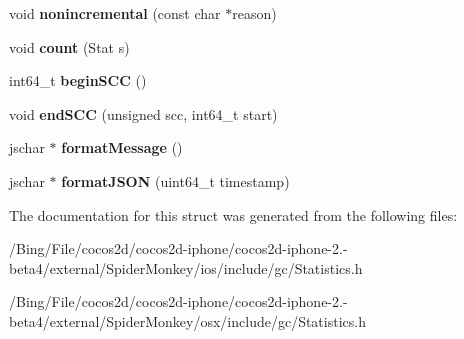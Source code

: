 \begin{DoxyCompactItemize}
\item 
\hypertarget{structjs_1_1gcstats_1_1_statistics_ab71d750226cbb59fd2d0da02285a755c}{void {\bfseries nonincremental} (const char $\ast$reason)}\label{structjs_1_1gcstats_1_1_statistics_ab71d750226cbb59fd2d0da02285a755c}

\item 
\hypertarget{structjs_1_1gcstats_1_1_statistics_aea50e1fa21da3e2770e721401b13457b}{void {\bfseries count} (Stat s)}\label{structjs_1_1gcstats_1_1_statistics_aea50e1fa21da3e2770e721401b13457b}

\item 
\hypertarget{structjs_1_1gcstats_1_1_statistics_a812221f80b7d1d6190cb93b535b62001}{int64\-\_\-t {\bfseries begin\-S\-C\-C} ()}\label{structjs_1_1gcstats_1_1_statistics_a812221f80b7d1d6190cb93b535b62001}

\item 
\hypertarget{structjs_1_1gcstats_1_1_statistics_ac4263ad5f5a8de70f1fbaf395f9a79da}{void {\bfseries end\-S\-C\-C} (unsigned scc, int64\-\_\-t start)}\label{structjs_1_1gcstats_1_1_statistics_ac4263ad5f5a8de70f1fbaf395f9a79da}

\item 
\hypertarget{structjs_1_1gcstats_1_1_statistics_a28239af32d0fc1c30890fd88f78a0843}{jschar $\ast$ {\bfseries format\-Message} ()}\label{structjs_1_1gcstats_1_1_statistics_a28239af32d0fc1c30890fd88f78a0843}

\item 
\hypertarget{structjs_1_1gcstats_1_1_statistics_a8354558c67e276b40c167bbf1a331477}{jschar $\ast$ {\bfseries format\-J\-S\-O\-N} (uint64\-\_\-t timestamp)}\label{structjs_1_1gcstats_1_1_statistics_a8354558c67e276b40c167bbf1a331477}

\end{DoxyCompactItemize}


The documentation for this struct was generated from the following files\-:\begin{DoxyCompactItemize}
\item 
/\-Bing/\-File/cocos2d/cocos2d-\/iphone/cocos2d-\/iphone-\/2.-\/beta4/external/\-Spider\-Monkey/ios/include/gc/Statistics.\-h\item 
/\-Bing/\-File/cocos2d/cocos2d-\/iphone/cocos2d-\/iphone-\/2.-\/beta4/external/\-Spider\-Monkey/osx/include/gc/Statistics.\-h\end{DoxyCompactItemize}
